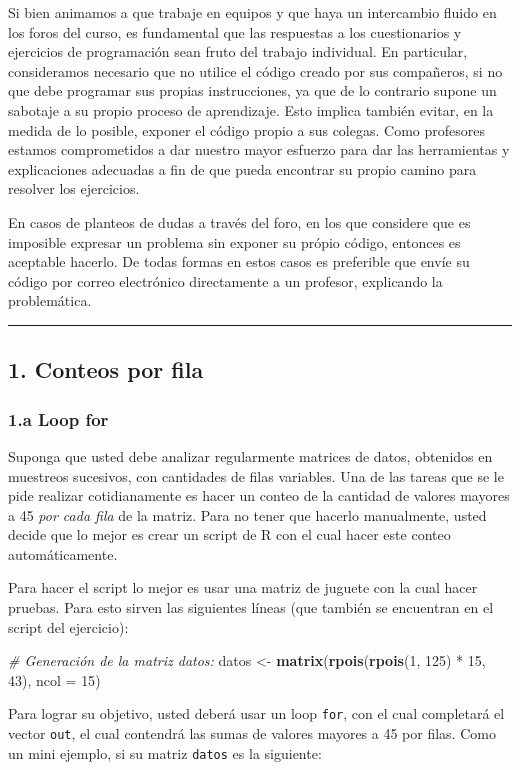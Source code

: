 \documentclass[]{article}
\newenvironment{Shaded}{}{}
\newcommand{\KeywordTok}[1]{\textcolor[rgb]{0.00,0.44,0.13}{\textbf{{#1}}}}
\newcommand{\DataTypeTok}[1]{\textcolor[rgb]{0.56,0.13,0.00}{{#1}}}
\newcommand{\DecValTok}[1]{\textcolor[rgb]{0.25,0.63,0.44}{{#1}}}
\newcommand{\CommentTok}[1]{\textcolor[rgb]{0.38,0.63,0.69}{\textit{{#1}}}}
\newcommand{\NormalTok}[1]{{#1}}
\begin{document}
Si bien animamos a que trabaje en equipos y que haya un intercambio
fluido en los foros del curso, es fundamental que las respuestas a los
cuestionarios y ejercicios de programación sean fruto del trabajo
individual. En particular, consideramos necesario que no utilice el
código creado por sus compañeros, si no que debe programar sus propias
instrucciones, ya que de lo contrario supone un sabotaje a su propio
proceso de aprendizaje. Esto implica también evitar, en la medida de lo
posible, exponer el código propio a sus colegas. Como profesores estamos
comprometidos a dar nuestro mayor esfuerzo para dar las herramientas y
explicaciones adecuadas a fin de que pueda encontrar su propio camino
para resolver los ejercicios.

En casos de planteos de dudas a través del foro, en los que considere
que es imposible expresar un problema sin exponer su própio código,
entonces es aceptable hacerlo. De todas formas en estos casos es
preferible que envíe su código por correo electrónico directamente a un
profesor, explicando la problemática.

\begin{center}\rule{3in}{0.4pt}\end{center}

\subsection{1. Conteos por fila}

\subsubsection{1.a Loop for}

Suponga que usted debe analizar regularmente matrices de datos,
obtenidos en muestreos sucesivos, con cantidades de filas variables. Una
de las tareas que se le pide realizar cotidianamente es hacer un conteo
de la cantidad de valores mayores a 45 \emph{por cada fila} de la
matriz. Para no tener que hacerlo manualmente, usted decide que lo mejor
es crear un script de R con el cual hacer este conteo automáticamente.

Para hacer el script lo mejor es usar una matriz de juguete con la cual
hacer pruebas. Para esto sirven las siguientes líneas (que también se
encuentran en el script del ejercicio):

\begin{Shaded}
\begin{Highlighting}[]
\CommentTok{# Generación de la matriz datos:}
\NormalTok{datos <- }\KeywordTok{matrix}\NormalTok{(}\KeywordTok{rpois}\NormalTok{(}\KeywordTok{rpois}\NormalTok{(}\DecValTok{1}\NormalTok{, }\DecValTok{125}\NormalTok{) * }\DecValTok{15}\NormalTok{, }\DecValTok{43}\NormalTok{), }\DataTypeTok{ncol =} \DecValTok{15}\NormalTok{)}
\end{Highlighting}
\end{Shaded}
Para lograr su objetivo, usted deberá usar un loop \texttt{for}, con el
cual completará el vector \texttt{out}, el cual contendrá las sumas de
valores mayores a 45 por filas. Como un mini ejemplo, si su matriz
\texttt{datos} es la siguiente:
\end{document}
